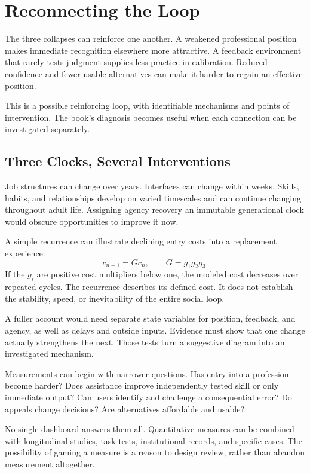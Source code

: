 \section{Reconnecting the Loop}

The three collapses can reinforce one another. A weakened professional position makes immediate recognition elsewhere more attractive. A feedback environment that rarely tests judgment supplies less practice in calibration. Reduced confidence and fewer usable alternatives can make it harder to regain an effective position.

This is a possible reinforcing loop, with identifiable mechanisms and points of intervention. The book's diagnosis becomes useful when each connection can be investigated separately.

\subsection{Three Clocks, Several Interventions}

Job structures can change over years. Interfaces can change within weeks. Skills, habits, and relationships develop on varied timescales and can continue changing throughout adult life. Assigning agency recovery an immutable generational clock would obscure opportunities to improve it now.

A simple recurrence can illustrate declining entry costs into a replacement experience:
\begin{equation}
 c_{n+1}=Gc_n,\qquad
 G=g_1g_2g_3.
\end{equation}
If the $g_i$ are positive cost multipliers below one, the modeled cost decreases over repeated cycles. The recurrence describes its defined cost. It does not establish the stability, speed, or inevitability of the entire social loop.

A fuller account would need separate state variables for position, feedback, and agency, as well as delays and outside inputs. Evidence must show that one change actually strengthens the next. Those tests turn a suggestive diagram into an investigated mechanism.

Measurements can begin with narrower questions. Has entry into a profession become harder? Does assistance improve independently tested skill or only immediate output? Can users identify and challenge a consequential error? Do appeals change decisions? Are alternatives affordable and usable?

No single dashboard answers them all. Quantitative measures can be combined with longitudinal studies, task tests, institutional records, and specific cases. The possibility of gaming a measure is a reason to design review, rather than abandon measurement altogether.

